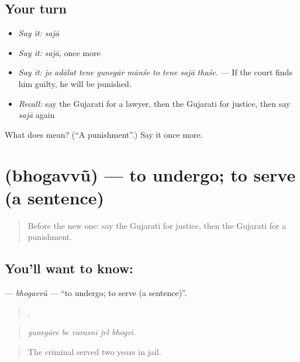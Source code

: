 \subsection*{Your turn}
\begin{itemize}
\raggedright
  \item \emph{Say it:} \emph{sajā}
  \item \emph{Say it:} \emph{sajā}, once more
  \item \emph{Say it:} \emph{jo adālat tene gunegār mānśe to tene sajā thaśe.} — If the court finds him guilty, he will be punished.
  \item \emph{Recall:} say the Gujarati for a lawyer, then the Gujarati for justice, then say \emph{sajā} again
\end{itemize}

\begin{tcolorbox}[breakable,colback=teal!4,colframe=teal!35!black,title={Before you move on}]
What does  mean? (\textquotedblleft{}A punishment\textquotedblright{}.) Say it once more.
\end{tcolorbox}
\section[\texorpdfstring{\gu{ભોગવવું} (bhogavvũ)}{ભોગવવું (bhogavvũ)}]{ (bhogavvũ) — to undergo; to serve (a sentence)}

\label{lesson:GU-C289-bhogavvu}



\begin{quote}
Before the new one: say the Gujarati for justice, then the Gujarati for a punishment.
\end{quote}

\subsection*{You'll want to know: }
\textbf{} — \emph{bhogavvũ} — \textquotedblleft{}to undergo; to serve (a sentence)\textquotedblright{}.

\begin{quote}
    .
\end{quote}

\begin{quote}
\emph{gunegāre be varasnī jel bhogvī.}
\end{quote}

\begin{quote}
The criminal served two years in jail.
\end{quote}


